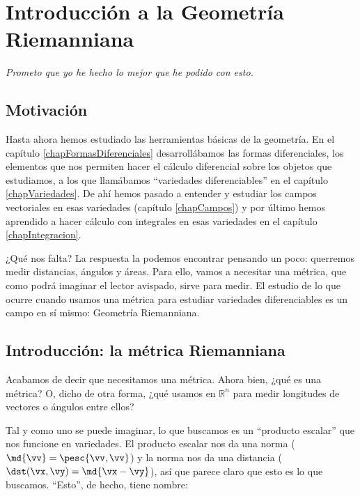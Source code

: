 \chapter{Introducción a la Geometría Riemanniana}
\label{chapGeometriaRiemman}

\hfill \textit{Prometo que yo he hecho lo mejor que he podido con esto.}

\section{Motivación}

Hasta ahora hemos estudiado las herramientas básicas de la geometría. En el capítulo \ref{chapFormasDiferenciales} desarrollábamos las formas diferenciales, los elementos que nos permiten hacer el cálculo diferencial sobre los objetos que estudiamos, a los que llamábamos ``variedades diferenciables'' en el capítulo \ref{chapVariedades}. De ahí hemos pasado a entender y estudiar los campos vectoriales en esas variedades (capítulo \ref{chapCampos}) y por último hemos aprendido a hacer cálculo con integrales en esas variedades en el capítulo \ref{chapIntegracion}.

¿Qué nos falta? La respuesta la podemos encontrar pensando un poco: querremos medir distancias, ángulos y áreas. Para ello, vamos a necesitar una métrica, que como podrá imaginar el lector avispado, sirve para medir. El estudio de lo que ocurre cuando usamos una métrica para estudiar variedades diferenciables es un campo en sí mismo: Geometría Riemanniana.

\section{Introducción: la métrica Riemanniana}

Acabamos de decir que necesitamos una métrica. Ahora bien, ¿qué es una métrica? O, dicho de otra forma, ¿qué usamos en $ℝ^n$ para medir longitudes de vectores o ángulos entre ellos?

Tal y como uno se puede imaginar, lo que buscamos es un ``producto escalar'' que nos funcione en variedades. El producto escalar nos da una norma ($\md{\vv} = \pesc{\vv, \vv}$) y la norma nos da una distancia ($\dst(\vx, \vy) = \md{\vx - \vy}$), así que parece claro que esto es lo que buscamos. ``Esto'', de hecho, tiene nombre:

